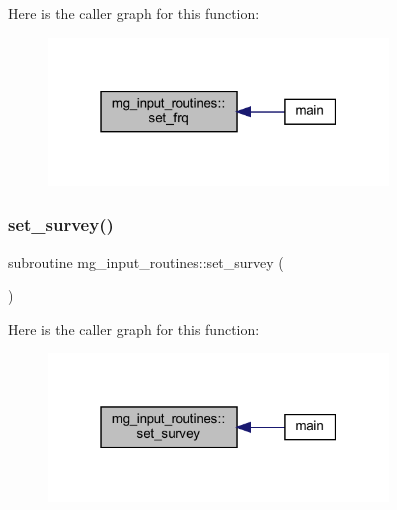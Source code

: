 Here is the caller graph for this function\+:
\nopagebreak
\begin{figure}[H]
\begin{center}
\leavevmode
\includegraphics[width=256pt]{namespacemg__input__routines_ac8682ae293c93e95b72b4b7c222f9ed4_icgraph}
\end{center}
\end{figure}
\mbox{\label{namespacemg__input__routines_af6f593fecea83164d8d0352ef801c23b}} 
\subsubsection{\texorpdfstring{set\+\_\+survey()}{set\_survey()}}
{\footnotesize\ttfamily subroutine mg\+\_\+input\+\_\+routines\+::set\+\_\+survey (\begin{DoxyParamCaption}{ }\end{DoxyParamCaption})}

Here is the caller graph for this function\+:
\nopagebreak
\begin{figure}[H]
\begin{center}
\leavevmode
\includegraphics[width=256pt]{namespacemg__input__routines_af6f593fecea83164d8d0352ef801c23b_icgraph}
\end{center}
\end{figure}
\mbox{\label{namespacemg__input__routines_a1b72deaf9809d0b370c1a68cd01e9d32}} 
